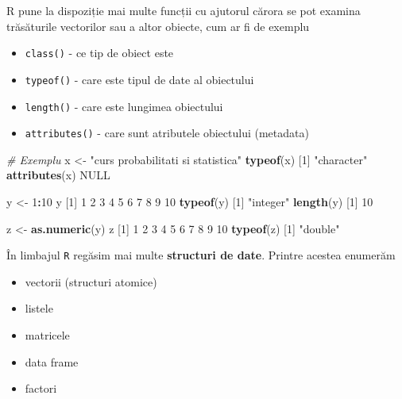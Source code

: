 \documentclass[]{article}
\newenvironment{Shaded}{\begin{snugshade}}{\end{snugshade}}
\newcommand{\KeywordTok}[1]{\textcolor[rgb]{0.13,0.29,0.53}{\textbf{#1}}}
\newcommand{\DecValTok}[1]{\textcolor[rgb]{0.00,0.00,0.81}{#1}}
\newcommand{\StringTok}[1]{\textcolor[rgb]{0.31,0.60,0.02}{#1}}
\newcommand{\CommentTok}[1]{\textcolor[rgb]{0.56,0.35,0.01}{\textit{#1}}}
\newcommand{\OtherTok}[1]{\textcolor[rgb]{0.56,0.35,0.01}{#1}}
\newcommand{\OperatorTok}[1]{\textcolor[rgb]{0.81,0.36,0.00}{\textbf{#1}}}
\newcommand{\NormalTok}[1]{#1}
\providecommand{\tightlist}{%
  \setlength{\itemsep}{0pt}\setlength{\parskip}{0pt}}
\begin{document}
R pune la dispoziție mai multe funcții cu ajutorul cărora se pot examina
trăsăturile vectorilor sau a altor obiecte, cum ar fi de exemplu

\begin{itemize}
\tightlist
\item
  \texttt{class()} - ce tip de obiect este
\item
  \texttt{typeof()} - care este tipul de date al obiectului
\item
  \texttt{length()} - care este lungimea obiectului
\item
  \texttt{attributes()} - care sunt atributele obiectului (metadata)
\end{itemize}

\begin{Shaded}
\begin{Highlighting}[]
\CommentTok{# Exemplu}
\NormalTok{x <-}\StringTok{ "curs probabilitati si statistica"}
\KeywordTok{typeof}\NormalTok{(x)}
\NormalTok{[}\DecValTok{1}\NormalTok{] }\StringTok{"character"}
\KeywordTok{attributes}\NormalTok{(x)}
\OtherTok{NULL}

\NormalTok{y <-}\StringTok{ }\DecValTok{1}\OperatorTok{:}\DecValTok{10}
\NormalTok{y}
\NormalTok{ [}\DecValTok{1}\NormalTok{]  }\DecValTok{1}  \DecValTok{2}  \DecValTok{3}  \DecValTok{4}  \DecValTok{5}  \DecValTok{6}  \DecValTok{7}  \DecValTok{8}  \DecValTok{9} \DecValTok{10}
\KeywordTok{typeof}\NormalTok{(y)}
\NormalTok{[}\DecValTok{1}\NormalTok{] }\StringTok{"integer"}
\KeywordTok{length}\NormalTok{(y)}
\NormalTok{[}\DecValTok{1}\NormalTok{] }\DecValTok{10}

\NormalTok{z <-}\StringTok{ }\KeywordTok{as.numeric}\NormalTok{(y)}
\NormalTok{z}
\NormalTok{ [}\DecValTok{1}\NormalTok{]  }\DecValTok{1}  \DecValTok{2}  \DecValTok{3}  \DecValTok{4}  \DecValTok{5}  \DecValTok{6}  \DecValTok{7}  \DecValTok{8}  \DecValTok{9} \DecValTok{10}
\KeywordTok{typeof}\NormalTok{(z)}
\NormalTok{[}\DecValTok{1}\NormalTok{] }\StringTok{"double"}
\end{Highlighting}
\end{Shaded}

În limbajul \texttt{R} regăsim mai multe \textbf{structuri de date}.
Printre acestea enumerăm

\begin{itemize}
\tightlist
\item
  vectorii (structuri atomice)
\item
  listele
\item
  matricele
\item
  data frame
\item
  factori
\end{itemize}
\end{document}
